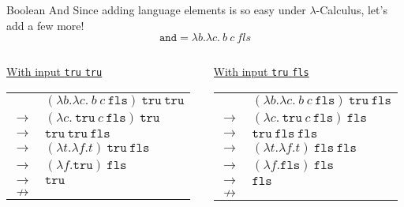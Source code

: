 \documentclass[11pt]{beamer}
\begin{document}
\begin{frame}[fragile=singleslide]{Boolean And}
Since adding language elements is so easy under $\lambda$-Calculus, let's add a few more! 
\begin{equation}
\texttt{and} = \lambda b. \lambda c.\:b\:c\:fls
\end{equation}

\begin{columns}
\begin{column}{0.5\textwidth}
\begin{center}
\underline{With input \texttt{tru} \texttt{tru}}
\begin{tabular}{c l}
& $(\lambda b. \lambda c.\:b\:c\:\texttt{fls})\:\texttt{tru}\:\texttt{tru}$ \\ 
$\rightarrow$ & $(\lambda c.\:\texttt{tru}\:c\:\texttt{fls})\:\texttt{tru}$ \\
$\rightarrow$ & $\texttt{tru}\:\texttt{tru}\:\texttt{fls}$ \\
$\rightarrow$ & $(\lambda t. \lambda f. t)\:\texttt{tru}\:\texttt{fls}$ \\
$\rightarrow$ & $(\lambda f. \texttt{tru})\:\texttt{fls}$ \\
$\rightarrow$ & $\texttt{tru}$ \\
$\nrightarrow$ & \\
\end{tabular}
\end{center}

\end{column}
\begin{column}{0.5\textwidth}
\begin{center}
\underline{With input \texttt{tru} \texttt{fls}}
\begin{tabular}{c l}
& $(\lambda b. \lambda c.\:b\:c\:\texttt{fls})\:\texttt{tru}\:\texttt{fls}$ \\ 
$\rightarrow$ & $(\lambda c.\:\texttt{tru}\:c\:\texttt{fls})\:\texttt{fls}$ \\
$\rightarrow$ & $\texttt{tru}\:\texttt{fls}\:\texttt{fls}$ \\
$\rightarrow$ & $(\lambda t. \lambda f. t)\:\texttt{fls}\:\texttt{fls}$ \\
$\rightarrow$ & $(\lambda f. \texttt{fls})\:\texttt{fls}$ \\
$\rightarrow$ & $\texttt{fls}$ \\
$\nrightarrow$ & \\
\end{tabular}
\end{center}
\end{column}
\end{columns}
\end{frame}
\end{document}
